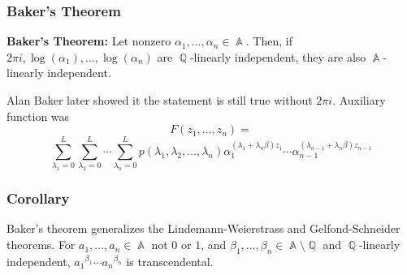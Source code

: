 \documentclass{beamer}
\DeclareMathOperator{\A}{\mathbb{A}}
\DeclareMathOperator{\Q}{\mathbb{Q}}
\begin{document}
    \begin{frame}
        \frametitle{Baker's Theorem}
        \begin{center}
        \begin{mybox}
            \textbf{Baker's Theorem:} Let nonzero $\alpha_1, \ldots, \alpha_n \in \A$. Then, if $2\pi i, \log(\alpha_1), \ldots, \log(\alpha_{n})$ are $\Q$-linearly independent, they are also $\A$-linearly independent.
        \end{mybox}
        Alan Baker later showed it the statement is still true without $2 \pi i$. Auxiliary function was \[F(z_1, \ldots, z_n) = \] \[\sum\limits_{\lambda_1 = 0}^{L}\sum\limits_{\lambda_2=0}^{L} \cdots \sum\limits_{\lambda_n = 0}^{L}p(\lambda_1, \lambda_2, \ldots, \lambda_n)\alpha_1^{(\lambda_1 + \lambda_n\beta)z_1}\cdots \alpha_{n-1}^{(\lambda_{n-1}+\lambda_{n}\beta)z_{n-1}}\]
        \end{center}
    \end{frame}

    \begin{frame}
        \frametitle{Corollary}
        Baker's theorem generalizes the Lindemann-Weierstrass and Gelfond-Schneider theorems. For $a_1, \ldots, a_n \in \A$ not $0$ or $1$, and $\beta_1, \ldots, \beta_n \in \A \setminus \Q$ and $\Q$-linearly independent, ${a_1}^{\beta_1}\cdots {a_n}^{\beta_n}$ is transcendental.
    \end{frame}
\end{document}
